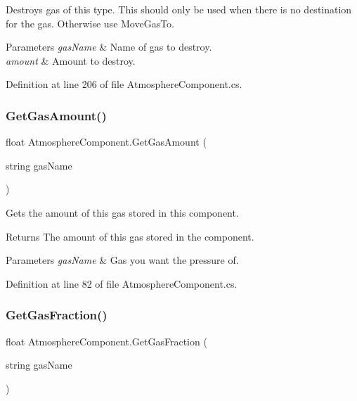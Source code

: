 Destroys gas of this type. This should only be used when there is no destination for the gas. Otherwise use Move\+Gas\+To. 


\begin{DoxyParams}{Parameters}
{\em gas\+Name} & Name of gas to destroy.\\
\hline
{\em amount} & Amount to destroy.\\
\hline
\end{DoxyParams}


Definition at line 206 of file Atmosphere\+Component.\+cs.

\mbox{\label{class_atmosphere_component_af15c6de153494ee1908429e72575b08b}} 
\subsubsection{\texorpdfstring{Get\+Gas\+Amount()}{GetGasAmount()}}
{\footnotesize\ttfamily float Atmosphere\+Component.\+Get\+Gas\+Amount (\begin{DoxyParamCaption}\item[{string}]{gas\+Name }\end{DoxyParamCaption})}



Gets the amount of this gas stored in this component. 

\begin{DoxyReturn}{Returns}
The amount of this gas stored in the component.
\end{DoxyReturn}

\begin{DoxyParams}{Parameters}
{\em gas\+Name} & Gas you want the pressure of.\\
\hline
\end{DoxyParams}


Definition at line 82 of file Atmosphere\+Component.\+cs.

\mbox{\label{class_atmosphere_component_afb20b22d2f7601b7647a716c1baf4a27}} 
\subsubsection{\texorpdfstring{Get\+Gas\+Fraction()}{GetGasFraction()}}
{\footnotesize\ttfamily float Atmosphere\+Component.\+Get\+Gas\+Fraction (\begin{DoxyParamCaption}\item[{string}]{gas\+Name }\end{DoxyParamCaption})}



